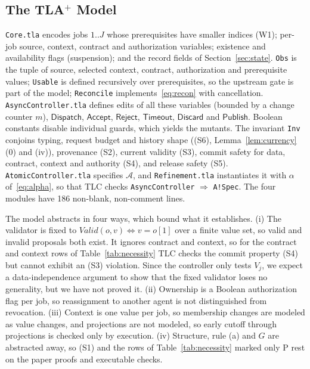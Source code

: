 \documentclass[pdflatex,sn-mathphys-num]{sn-jnl}
\theoremstyle{thmstyleone}%
\theoremstyle{thmstyletwo}%
\theoremstyle{thmstylethree}%
\newcommand{\tla}{TLA$^+$}
\newcommand{\Acc}{\mathsf{Accept}}
\newcommand{\Disp}{\mathsf{Dispatch}}
\newcommand{\TLALines}{186}
\begin{document}
\subsection{The \tla{} Model}
\texttt{Core.tla} encodes jobs $1..J$ whose prerequisites have smaller indices (W1); per-job source, context, contract and authorization variables; existence and availability flags (suspension); and the record fields of Section~\ref{sec:state}. \texttt{Obs} is the tuple of source, selected context, contract, authorization and prerequisite values; \texttt{Usable} is defined recursively over prerequisites, so the upstream gate is part of the model; \texttt{Reconcile} implements~\eqref{eq:recon} with cancellation. \texttt{AsyncController.tla} defines edits of all these variables (bounded by a change counter $m$), $\Disp$, $\Acc$, $\mathsf{Reject}$, $\mathsf{Timeout}$, $\mathsf{Discard}$ and $\mathsf{Publish}$. Boolean constants disable individual guards, which yields the mutants. The invariant \texttt{Inv} conjoins typing, request budget and history shape ((S6), Lemma~\ref{lem:currency}(0) and (iv)), provenance (S2), current validity (S3), commit safety for data, contract, context and authority (S4), and release safety (S5). \texttt{AtomicController.tla} specifies $\mathcal A$, and \texttt{Refinement.tla} instantiates it with $\alpha$ of~\eqref{eq:alpha}, so that TLC checks \texttt{AsyncController} $\Rightarrow$ \texttt{A!Spec}. The four modules have \TLALines{} non-blank, non-comment lines.

The model abstracts in four ways, which bound what it establishes. (i) The validator is fixed to $\mathit{Valid}(o,v)\iff v=o[1]$ over a finite value set, so valid and invalid proposals both exist. It ignores contract and context, so for the contract and context rows of Table~\ref{tab:necessity} TLC checks the commit property (S4) but cannot exhibit an (S3) violation. Since the controller only tests $V_j$, we expect a data-independence argument to show that the fixed validator loses no generality, but we have not proved it. (ii) Ownership is a Boolean authorization flag per job, so reassignment to another agent is not distinguished from revocation. (iii) Context is one value per job, so membership changes are modeled as value changes, and projections are not modeled, so early cutoff through projections is checked only by execution. (iv) Structure, rule (a) and $G$ are abstracted away, so (S1) and the rows of Table~\ref{tab:necessity} marked only P rest on the paper proofs and executable checks.
\end{document}
